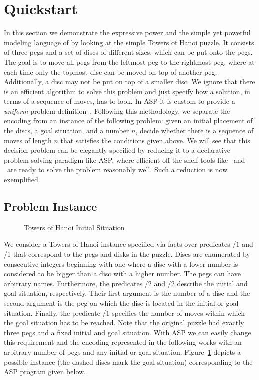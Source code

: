 %
\section{Quickstart}\label{sec:quickstart}
In this section we demonstrate the expressive power 
and the simple yet powerful modeling language of \gringo{}
by looking at the simple Towers of Hanoi puzzle.
It consists of three pegs and a set of discs of different sizes, 
which can be put onto the pegs. 
The goal is to move all pegs from the leftmost peg to the rightmost peg,
where at each time only the topmost disc can be moved on top of another peg.
Additionally, a disc may not be put on top of a smaller disc.
We ignore that there is an efficient algorithm to solve this problem 
and just specify how a solution, in terms of a sequence of moves, has to look.
In ASP it is custom to provide a \emph{uniform}
problem definition~\cite{martru99a,niemela99a,schlipf95a}.
Following this methodology, we separate the encoding
from an instance of the following problem:
given an initial placement of the discs, a goal situation, and a number $n$,
decide whether there is a sequence of moves of length $n$ 
that satisfies the conditions given above.
We will see that this decision problem can be elegantly 
specified by reducing it to a declarative problem solving paradigm like ASP,
where efficient off-the-shelf tools like \gringo\ and \clasp\
are ready to solve the problem reasonably well.
Such a reduction is now exemplified.

\subsection{Problem Instance}

\begin{figure}[tb]
\centering
\hanoiInstance
\caption{Towers of Hanoi Initial Situation\label{fig:toh_inst}}
\end{figure}

We consider a Towers of Hanoi instance specified via facts over predicates
\pred{peg}/$1$ and \pred{disk}/$1$ that correspond to the pegs and disks in the puzzle.
Discs are enumerated by consecutive integers beginning with one
where a disc with a lower number is considered to be bigger than a disc with a higher number.
The pegs can have arbitrary names. 
Furthermore, the predicates /$2$ and /$2$ describe the initial and goal situation, respectively.
Their first argument is the number of a disc and the second argument is the peg 
on which the disc is located in the initial or goal situation.
Finally, the predicate /$1$ specifies the number of moves within which the goal situation has to be reached.
Note that the original puzzle had exactly three pegs and a fixed initial and goal situation.
With ASP we can easily change this requirement and 
the encoding represented in the following works with an arbitrary number of pegs and any initial or goal situation.
Figure~\ref{fig:toh_inst} depicts a possible instance (the dashed discs mark the goal situation) 
corresponding to the ASP program given below.

